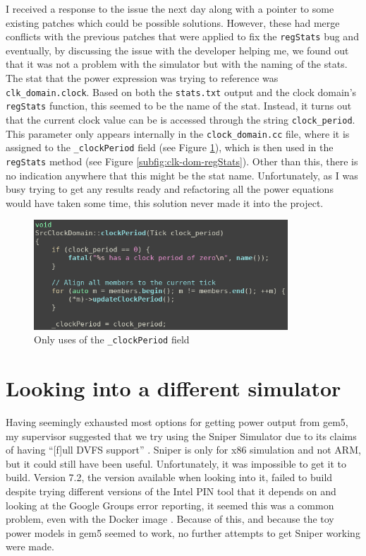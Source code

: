 I received a response to the issue the next day along with a pointer to 
some existing patches which could be possible solutions. However, these had 
merge conflicts with the previous patches that were applied to fix the 
\texttt{regStats} bug and eventually, by discussing the issue with the 
developer helping me, we found out that it was not a problem with the 
simulator but with the naming of the stats. The stat that the power 
expression was trying to reference was \texttt{clk\_domain.clock}. Based on 
both the \texttt{stats.txt} output and the clock domain's \texttt{regStats} 
function, this seemed to be the name of the stat. Instead, it turns out 
that the current clock value can be is accessed through the string 
\texttt{clock\_period}. This parameter only appears internally in the 
\texttt{clock\_domain.cc} file, where it is assigned to the 
\texttt{\_clockPeriod} field (see Figure \ref{fig:clock-period-src}), which 
is then used in the \texttt{regStats} method (see Figure 
\ref{subfig:clk-dom-regStats}). Other than this, there is no indication 
anywhere that this might be the stat name. Unfortunately, as I was busy 
trying to get any results ready and refactoring all the power equations 
would have taken some time, this solution never made it into the project.
\begin{figure}[H]
    \centering
    \includegraphics[width=0.85\textwidth]{screenshots/power-model-eldritchness/clock-period-src.png}
    \caption{Only uses of the \texttt{\_clockPeriod} field}
    \label{fig:clock-period-src}
\end{figure}

\section{Looking into a different simulator}
Having seemingly exhausted most options for getting power output from gem5, my 
supervisor suggested that we try using the Sniper Simulator 
\cite{carlson_sniper_2011,carlson_evaluation_2014} due to its claims of having 
``[f]ull DVFS support'' \cite{noauthor_sniper_2020}. Sniper is only for x86 
simulation and not ARM, but it could still have been useful. Unfortunately, it 
was impossible to get it to build. Version 7.2, the version available when 
looking into it, failed to build despite trying different versions of the Intel 
PIN tool that it depends on \cite{noauthor_getting_2019} and looking at the 
Google Groups error reporting, it seemed this was a common problem, even with 
the Docker image \cite{noauthor_error_2020}. Because of this, and because the 
toy power models in gem5 seemed to work, no further attempts to get Sniper 
working were made.
